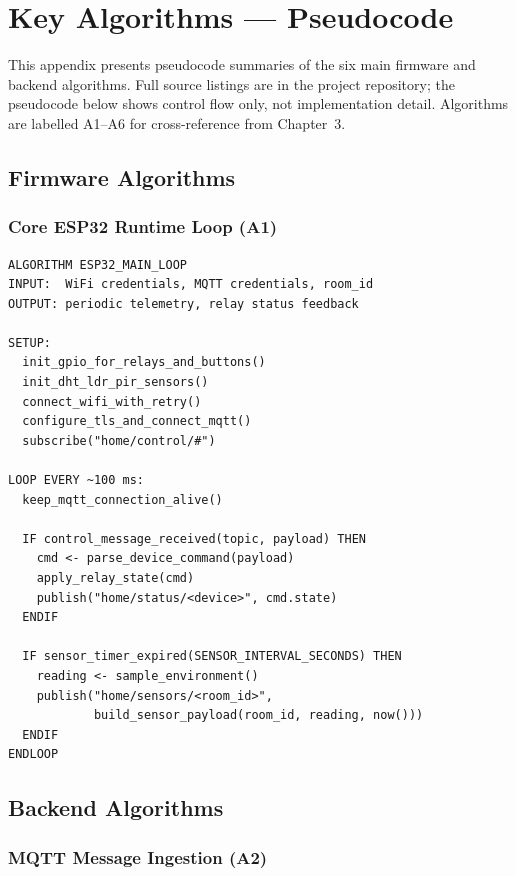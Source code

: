 \chapter{Key Algorithms --- Pseudocode}
\label{app:algorithms}

This appendix presents pseudocode summaries of the six main firmware and
backend algorithms. Full source listings are in the project repository;
the pseudocode below shows control flow only, not implementation detail.
Algorithms are labelled A1--A6 for cross-reference from Chapter~3.

\section{Firmware Algorithms}

\subsection{Core ESP32 Runtime Loop (A1)}

\begin{lstlisting}[numbers=none,caption={A1: ESP32 firmware runtime loop},label={lst:pseudo_esp32_loop}]
ALGORITHM ESP32_MAIN_LOOP
INPUT:  WiFi credentials, MQTT credentials, room_id
OUTPUT: periodic telemetry, relay status feedback

SETUP:
  init_gpio_for_relays_and_buttons()
  init_dht_ldr_pir_sensors()
  connect_wifi_with_retry()
  configure_tls_and_connect_mqtt()
  subscribe("home/control/#")

LOOP EVERY ~100 ms:
  keep_mqtt_connection_alive()

  IF control_message_received(topic, payload) THEN
    cmd <- parse_device_command(payload)
    apply_relay_state(cmd)
    publish("home/status/<device>", cmd.state)
  ENDIF

  IF sensor_timer_expired(SENSOR_INTERVAL_SECONDS) THEN
    reading <- sample_environment()
    publish("home/sensors/<room_id>",
            build_sensor_payload(room_id, reading, now()))
  ENDIF
ENDLOOP
\end{lstlisting}

\section{Backend Algorithms}

\subsection{MQTT Message Ingestion (A2)}

